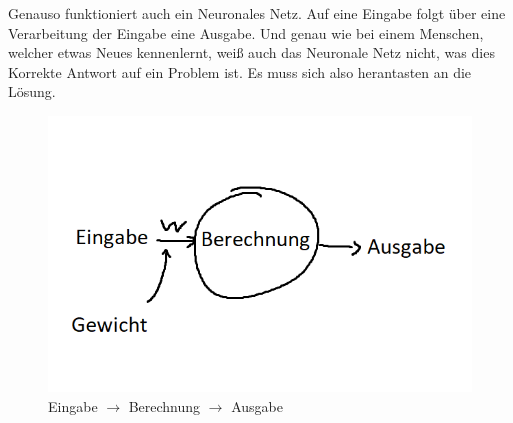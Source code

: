 Genauso funktioniert auch ein Neuronales Netz. Auf eine Eingabe folgt über eine Verarbeitung der Eingabe eine Ausgabe. Und genau wie bei einem Menschen, welcher etwas Neues kennenlernt, weiß auch das Neuronale Netz nicht, was dies Korrekte Antwort auf ein Problem ist. Es muss sich also herantasten an die Lösung.

\begin{figure}[H]
    \centering
    \includegraphics[scale=1]{pics/eba.png}
    \caption{Eingabe $\rightarrow$ Berechnung $\rightarrow$ Ausgabe}
    \label{fig:tech:eba}
\end{figure}

